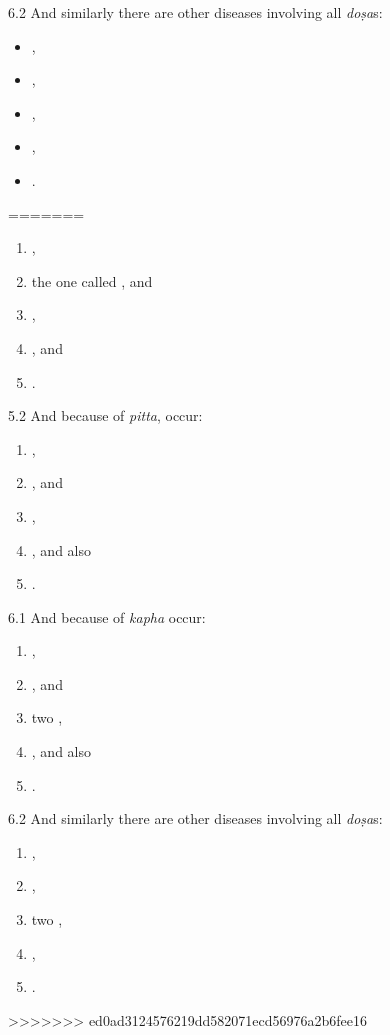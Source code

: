 \begin{translation}
\item [6.2] And similarly there are other diseases involving all \emph{doṣa}s:
	\begin{itemize}
		\item {},
		\item {},
		\item {},
		\item {},
		\item {}.
	\end{itemize}
=======
	\begin{enumerate}
		\item {},
		\item the one called , and
		\item {},
		\item {}, and
		\item {}.
	\end{enumerate}
\item [5.2] And because of \emph{pitta}, occur:
	\begin{enumerate}
		\item {},
		\item {}, and
		\item {},
		\item {}, and also
		\item {}.
	\end{enumerate}


\item [6.1] And because of \emph{kapha} occur:
	\begin{enumerate}
		\item {},
		\item {}, and
		\item two ,
		\item {}, and also
		\item {}.
	\end{enumerate}

\item [6.2] And similarly there are other diseases involving all \emph{doṣa}s:
	\begin{enumerate}
		\item {},
		\item {},
		\item two ,
		\item {},
		\item {}.
	\end{enumerate}
>>>>>>> ed0ad3124576219dd582071ecd56976a2b6fee16


\end{translation}
